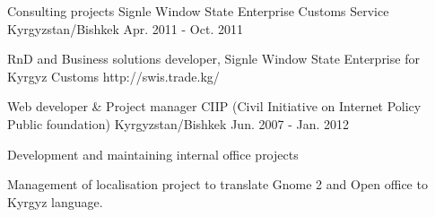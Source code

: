 \begin{cventries}
{      %
    }
  \cventry
    {Consulting projects}
    {Signle Window State Enterprise Customs Service}
    {Kyrgyzstan/Bishkek}
    {Apr. 2011 - Oct. 2011}
    {
      \begin{cvitems}
        \item {RnD and Business solutions developer, Signle Window State Enterprise for Kyrgyz Customs http://swis.trade.kg/}
      \end{cvitems}
    }

  \cventry
    {Web developer \& Project manager}
    {CIIP (Civil Initiative on Internet Policy Public foundation)}
    {Kyrgyzstan/Bishkek}
    {Jun. 2007 - Jan. 2012}
    {
      \begin{cvitems}
        \item {Development and maintaining internal office projects}
        \item {Management of localisation project to translate Gnome 2 and Open office to Kyrgyz language.}
      \end{cvitems}
    }
\end{cventries}
